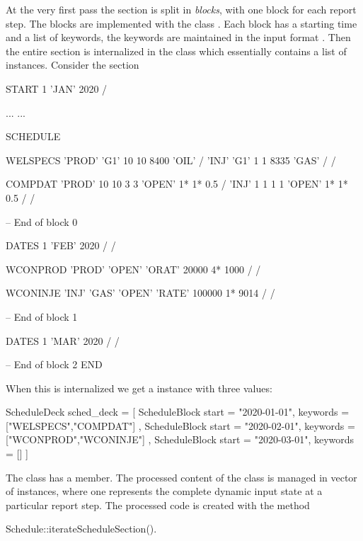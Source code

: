 At the very first pass the  section is split in \emph{blocks}, with
one block for each report step. The blocks are implemented with the class
. Each block has a starting time and a list of
keywords, the keywords are maintained in the input format
. Then the entire  section is internalized
in the class  which essentially contains a list of
 instances. Consider the  section
\begin{deck}
START
  1 'JAN' 2020 /

...
...

SCHEDULE

WELSPECS
	'PROD'	'G1'	10	10	8400	'OIL' /
	'INJ'	'G1'	1	1	8335	'GAS' /
/

COMPDAT
	'PROD'	10	10	3	3	'OPEN'	1*	1*	0.5 /
	'INJ'	1	1	1	1	'OPEN'	1*	1*	0.5 /
/

-- End of block 0

DATES
   1 'FEB' 2020 /
/

WCONPROD
	'PROD' 'OPEN' 'ORAT' 20000 4* 1000 /
/

WCONINJE
	'INJ'	'GAS'	'OPEN'	'RATE'	100000 1* 9014 /
/

-- End of block 1

DATES
  1 'MAR' 2020 /
/

-- End of block 2
END

\end{deck}

When this is internalized we get a  instance with three
 values:

\begin{code}
ScheduleDeck sched_deck = [
  ScheduleBlock {
    start = "2020-01-01",
    keywords = ["WELSPECS","COMPDAT"]
  },
  ScheduleBlock {
    start = "2020-02-01",
    keywords = ["WCONPROD","WCONINJE"]
  },
  ScheduleBlock {
    start = "2020-03-01",
    keywords = []
  }
]
\end{code}

The  class has a  member. The
processed content of the  class is managed in vector of
 instances, where one 
represents the complete dynamic input state at a particular report step. The
processed  code is created with the method
\begin{code}
  Schedule::iterateScheduleSection().
\end{code}

